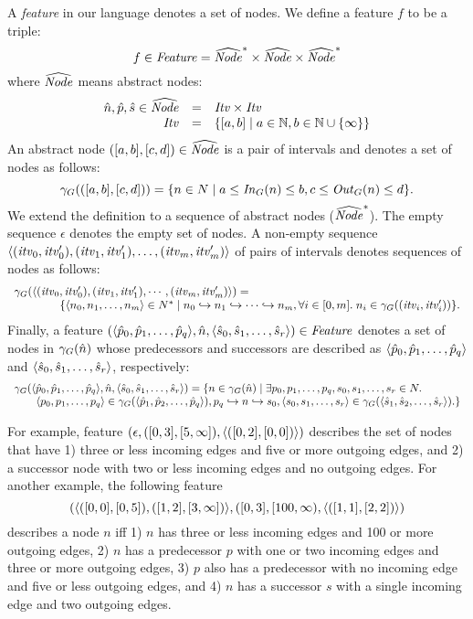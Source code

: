 A {\em feature} in our language denotes a set of nodes. We define a feature $f$ to be a triple:
\[
f \in {\it Feature} = \widehat{\it Node}^* \times \widehat{\it Node} \times \widehat{\it Node}^*
\]
where $\widehat{\it Node}$ means abstract nodes:
\[
\begin{array}{rcl}
{\hat{n}}, {\hat{p}}, {\hat{s}} \in \widehat{\it Node} &=& {\it Itv} \times {\it Itv} \\
{\it Itv} &=& \{ [a,b] \mid a \in \mathbb{N}, b \in \mathbb{N} \cup \{ \infty \} \}
\end{array}
\]
An abstract node $([a,b], [c,d]) \in \widehat{\it Node}$ is a pair of intervals and denotes a set of nodes as follows:
\[
\gamma_G(([a,b], [c,d])) = \{ n \in N \mid a \le {\it In}_G(n) \le b, c \le {\it Out}_G(n) \le d \}.
\]
We extend the definition to a sequence of abstract nodes ($\widehat{\it Node}^*$).
The empty sequence $\epsilon$ denotes the empty set of nodes.
A non-empty sequence $\langle ({\it itv}_0, {\it itv}'_0), ({\it itv}_1, {\it itv}'_1), \dots, ({\it itv}_m, {\it itv}'_m) \rangle$
of pairs of intervals denotes sequences of nodes as follows:
\[
\begin{array}{l}
\gamma_G(\langle ({\it itv}_0, {\it itv}'_0),({\it itv}_1, {\it itv}'_1),\cdots, ({\it itv}_m, {\it itv}'_m) \rangle) = \\
\qquad\qquad \{ \langle n_0,n_1,\dots,n_m \rangle \in N^* \mid n_0 \hookrightarrow n_1 \hookrightarrow \cdots \hookrightarrow n_m, \forall i \in [0,m].\; n_i \in \gamma_G(({\it itv}_i, {\it itv}'_i)) \}.
\end{array}
\]
Finally, a feature  $(\langle {\hat{p}}_0,{\hat{p}}_1,\dots,{\hat{p}}_q \rangle, {\hat{n}}, \langle {\hat{s}}_0,{\hat{s}}_1,\dots,{\hat{s}}_r \rangle) \in {\it Feature}$
 denotes a set of nodes in $\gamma_G({\hat{n}})$ whose predecessors and successors are described as
$\langle {\hat{p}}_0,{\hat{p}}_1,\dots,{\hat{p}}_q \rangle$ and $\langle {\hat{s}}_0,{\hat{s}}_1,\dots,{\hat{s}}_r \rangle$, respectively:
\[
\begin{array}{l}
 \gamma_G(\langle {\hat{p}}_0,{\hat{p}}_1,\dots,{\hat{p}}_q \rangle, {\hat{n}}, \langle {\hat{s}}_0,{\hat{s}}_1,\dots,{\hat{s}}_r \rangle) =  \{ n \in \gamma_G({\hat{n}}) \mid
\exists p_0,p_1,\dots,p_q, s_0,s_1,\dots,s_r \in N.\; \\
\qquad
\langle p_0,p_1,\dots,p_q \rangle \in \gamma_G(\langle {\hat{p}}_1,{\hat{p}}_2,\dots,{\hat{p}}_q \rangle), p_q \hookrightarrow n \hookrightarrow s_0,
\langle s_0,s_1,\dots,s_r \rangle \in \gamma_G(\langle {\hat{s}}_1,{\hat{s}}_2,\dots,{\hat{s}}_r \rangle).
\}
\end{array}
\]


For example, feature $(\epsilon,([0,3],[5,\infty]), \langle ([0,2],[0,0]) \rangle )$ describes the set of nodes that have 1) three or less incoming edges and five or more outgoing edges, and 2) a successor node with two or less incoming edges and no outgoing edges.
For another example, the following feature
\[
(\langle ([0,0],[0,5]), ([1,2], [3,\infty]) \rangle, ([0,3], [100,\infty), \langle ([1,1], [2,2]) \rangle)
\]
describes a node $n$ iff 1) $n$ has three or less incoming edges and 100 or more outgoing edges, 2) $n$ has a predecessor $p$  with one or two incoming edges and three or more outgoing edges,  3) $p$ also has a predecessor with no incoming edge and five or less outgoing edges, and 4) $n$ has a successor $s$ with a single incoming edge and two outgoing edges.


